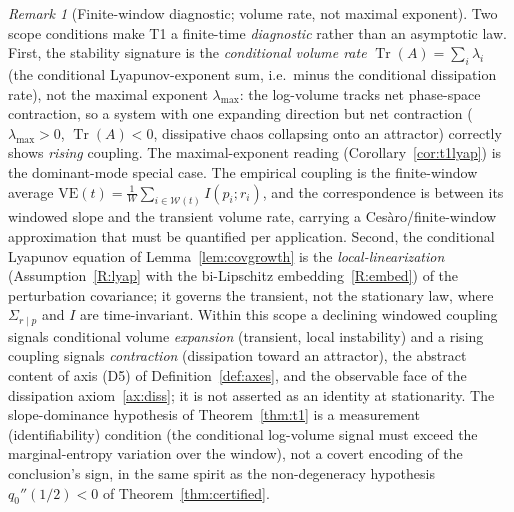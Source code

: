 \documentclass[11pt]{article}
\theoremstyle{plain}
\theoremstyle{definition}
\theoremstyle{remark}
\newtheorem{remark}[theorem]{Remark}
\begin{document}
\begin{remark}[Finite-window diagnostic; volume rate, not maximal exponent]\label{rem:t1scope}
Two scope conditions make T1 a finite-time \emph{diagnostic} rather than an asymptotic law. First, the stability signature is the \emph{conditional volume rate} $\operatorname{Tr}(A)=\sum_i\lambda_i$ (the conditional Lyapunov-exponent sum, i.e.\ minus the conditional dissipation rate), not the maximal exponent $\lambda_{\max}$: the log-volume tracks net phase-space contraction, so a system with one expanding direction but net contraction ($\lambda_{\max}>0$, $\operatorname{Tr}(A)<0$, dissipative chaos collapsing onto an attractor) correctly shows \emph{rising} coupling. The maximal-exponent reading (Corollary~\ref{cor:t1lyap}) is the dominant-mode special case. The empirical coupling is the finite-window average $\mathrm{VE}(t)=\tfrac1W\sum_{i\in\mathcal W(t)}I(p_i;r_i)$, and the correspondence is between its windowed slope and the transient volume rate, carrying a Ces\`aro/finite-window approximation that must be quantified per application. Second, the conditional Lyapunov equation of Lemma~\ref{lem:covgrowth} is the \emph{local-linearization} (Assumption~\ref{R:lyap} with the bi-Lipschitz embedding~\ref{R:embed}) of the perturbation covariance; it governs the transient, not the stationary law, where $\Sigma_{r\mid p}$ and $I$ are time-invariant. Within this scope a declining windowed coupling signals conditional volume \emph{expansion} (transient, local instability) and a rising coupling signals \emph{contraction} (dissipation toward an attractor), the abstract content of axis (D5) of Definition~\ref{def:axes}, and the observable face of the dissipation axiom~\ref{ax:diss}; it is not asserted as an identity at stationarity. The slope-dominance hypothesis of Theorem~\ref{thm:t1} is a measurement (identifiability) condition (the conditional log-volume signal must exceed the marginal-entropy variation over the window), not a covert encoding of the conclusion's sign, in the same spirit as the non-degeneracy hypothesis $q_0''(1/2)<0$ of Theorem~\ref{thm:certified}.
\end{remark}
\end{document}
